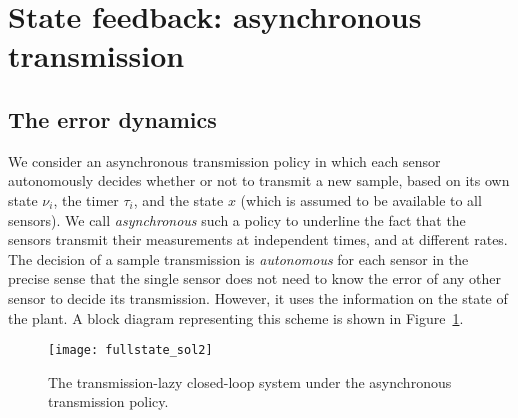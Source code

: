 \documentclass[twocolumn]{autart}
\begin{document}
\section{State feedback: asynchronous transmission}
\label{sec:asynchronous}

\subsection{The error dynamics}

We consider an asynchronous transmission policy
in which each sensor autonomously decides 
whether or not to transmit a new sample,
based on its own state $\nu_i$, the timer $\tau_i$, 
and the state $x$ (which is assumed to be available to all sensors).
{ We call \emph{asynchronous} such a policy to 
underline the fact that the sensors transmit their measurements
at independent times, and at different rates. 
The decision of a sample transmission is \emph{autonomous} for each sensor in the 
precise sense that the single sensor does not need to know the error
of any other sensor to decide its transmission. However, it uses the
information on the state of the plant. A block diagram representing this scheme is
shown in Figure~\ref{fig:SLa}.}

\begin{figure}[ht!]
\centering
\texttt{[image: fullstate\_sol2]}
 	\caption{The transmission-lazy closed-loop system under the asynchronous transmission policy.}
 	\label{fig:SLa}
\end{figure}
\end{document}
